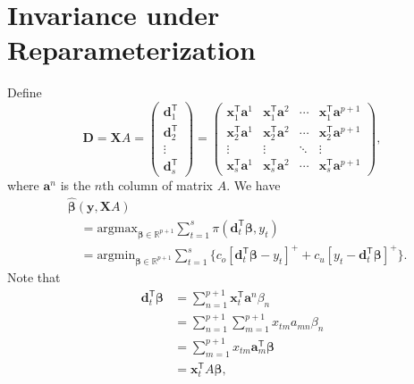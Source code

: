 \documentclass{article}
\begin{document}
\section{Invariance under Reparameterization}
\label{app:B}

Define
    \[
        \mathbf{D}=\mathbf{X}A
        =\begin{pmatrix}
            \mathbf{d}_1^{\mathsf{T}}\\
            \mathbf{d}_2^{\mathsf{T}}\\
            \vdots\\
            \mathbf{d}_s^{\mathsf{T}}
        \end{pmatrix}
        =\begin{pmatrix}
            \mathbf{x}_{1}^{\mathsf{T}}\mathbf{a}^1&\mathbf{x}_1^{\mathsf{T}}\mathbf{a}^2&\cdots &\mathbf{x}_1^{\mathsf{T}}\mathbf{a}^{p+1}\\
            \mathbf{x}_2^{\mathsf{T}}\mathbf{a}^1&\mathbf{x}_2^{\mathsf{T}}\mathbf{a}^2&\cdots &\mathbf{x}_2^{\mathsf{T}}\mathbf{a}^{p+1}\\
            \vdots &\vdots &\ddots &\vdots \\
            \mathbf{x}_s^{\mathsf{T}}\mathbf{a}^1&\mathbf{x}_s^{\mathsf{T}}\mathbf{a}^2&\cdots &\mathbf{x}_s^{\mathsf{T}}\mathbf{a}^{p+1}
        \end{pmatrix},
    \]
    where $\mathbf{a}^n$ is the $n$th column of matrix $A$. We have
    \[
        \begin{aligned}
            &\hat{\boldsymbol{\beta}}(\mathbf{y},\mathbf{X}A)\\
            &\quad=\text{argmax}_{\boldsymbol{\beta}\in \mathbb{R}^{p+1}}\displaystyle\sum_{t=1}^s{\pi(\mathbf{d}_t^{\mathsf{T}}\boldsymbol{\beta},y_t)}\\
            &\quad=\text{argmin}_{\boldsymbol{\beta}\in \mathbb{R}^{p+1}}\displaystyle\sum_{t=1}^s{\{c_o[\mathbf{d}_t^{\mathsf{T}}\boldsymbol{\beta}-y_t]^{+}+c_u[y_t-\mathbf{d}_t^{\mathsf{T}}\boldsymbol{\beta}]^{+}\}}.
        \end{aligned}
    \]
    Note that
    \[
        \begin{aligned}
            \mathbf{d}_t^{\mathsf{T}}\boldsymbol{\beta}
            &=\displaystyle\sum_{n=1}^{p+1}\mathbf{x}_t^{\mathsf{T}}\mathbf{a}^n\beta_n\\
            &=\displaystyle\sum_{n=1}^{p+1}\displaystyle\sum_{m=1}^{p+1}x_{tm}a_{mn}\beta_n\\
            &=\displaystyle\sum_{m=1}^{p+1}x_{tm}\mathbf{a}_m^{\mathsf{T}}\boldsymbol{\beta}\\
            &=\mathbf{x}_t^{\mathsf{T}}A\boldsymbol{\beta},
        \end{aligned}
    \]
\end{document}
